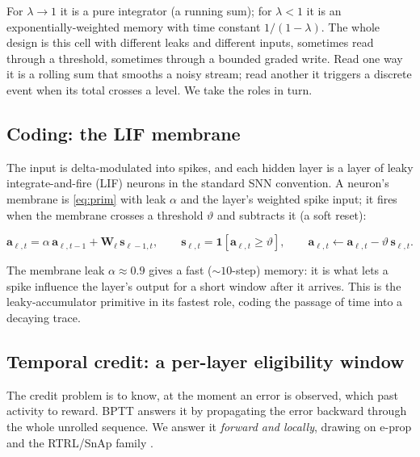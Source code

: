 \documentclass[11pt]{article}
\begin{document}
For \(\lambda \to 1\) it is a pure integrator (a running sum); for
\(\lambda < 1\) it is an exponentially-weighted memory with time
constant \(1/(1-\lambda)\). The whole design is this cell with different
leaks and different inputs, sometimes read through a threshold,
sometimes through a bounded graded write. Read one way it is a rolling
sum that smooths a noisy stream; read another it triggers a discrete
event when its total crosses a level. We take the roles in turn.

\hypertarget{sec:coding}{%
\subsection{Coding: the LIF membrane}\label{sec:coding}}

The input is delta-modulated into spikes, and each hidden layer is a
layer of leaky integrate-and-fire (LIF) neurons in the standard SNN
convention. A neuron's membrane is \eqref{eq:prim} with leak \(\alpha\)
and the layer's weighted spike input; it fires when the membrane crosses
a threshold \(\vartheta\) and subtracts it (a soft reset):

\begin{equation}
\bm a_{\ell,t} = \alpha\, \bm a_{\ell,t-1} + \bm W_\ell\, \bm s_{\ell-1,t}, \qquad
\bm s_{\ell,t} = \mathbf{1}\!\left[\bm a_{\ell,t} \ge \vartheta\right], \qquad
\bm a_{\ell,t} \leftarrow \bm a_{\ell,t} - \vartheta\, \bm s_{\ell,t}.
\label{eq:lif}
\end{equation}

The membrane leak \(\alpha \approx 0.9\) gives a fast
(\({\sim}10\)-step) memory: it is what lets a spike influence the
layer's output for a short window after it arrives. This is the
leaky-accumulator primitive in its fastest role, coding the passage of
time into a decaying trace.

\hypertarget{sec:credit}{%
\subsection{Temporal credit: a per-layer eligibility
window}\label{sec:credit}}

The credit problem is to know, at the moment an error is observed, which
past activity to reward. BPTT answers it by propagating the error
backward through the whole unrolled sequence. We answer it \emph{forward
and locally}, drawing on e-prop \cite{bellec2020eprop} and the
RTRL/SnAp family
\cite{williams1989learning, menick2021snap, marschall2020unified}.
\end{document}
